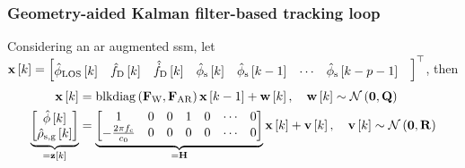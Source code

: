 \documentclass[
    hyperref={colorlinks,citecolor=DeepPink4,linkcolor=DarkRed,urlcolor=DarkBlue}
]{beamer_class}
\begin{document}
\begin{frame}[t]
	\frametitle{Geometry-aided Kalman filter-based tracking loop}
    Considering an \gls{ar} augmented \gls{ssm}, let \(\mathbf{x} \left[ k \right]= \begin{bmatrix}
        \hat{\phi}_{\mathrm{LOS}} \left[ k \right] &
        \hat{f}_{\mathrm{D}} \left[ k \right] &
        \hat{\dot{f}}_{\mathrm{D}} \left[ k \right] &
        \hat{\phi}_{\textnormal{s}} \left[ k \right] &
        \hat{\phi}_{\textnormal{s}} \left[ k-1 \right] &
        \cdots &
        \hat{\phi}_{\textnormal{s}} \left[ k-p-1 \right] &
    \end{bmatrix}^\top\), then
	\begin{align}
     \mathbf{x} \left[ k \right] & = \mathrm{blkdiag} \left( \mathbf{F}_{\mathrm{W}}, \mathbf{F}_{\mathrm{AR}} \right) \mathbf{x} \left[ k-1 \right] + \mathbf{w} \left[ k \right], \quad \mathbf{w} \left[ k \right] \sim \mathcal{N} \left( \mathbf{0}, \mathbf{Q} \right) \\
    \underbrace{\begin{bmatrix}
        \hat{\phi} \left[ k \right] \\
        \hat{\rho}_{\textnormal{s}, \textnormal{g}} \left[ k \right]
    \end{bmatrix}}_{= \mathbf{z} \left[ k \right]} & = \underbrace{\begin{bmatrix}
        1 & 0 & 0 & 1 & 0 & \cdots & 0 \\
        - \frac{2 \pi f_{\mathrm{c}}}{c_{0}} & 0 & 0 & 0 & 0 & \cdots & 0
    \end{bmatrix}}_{= \mathbf{H}} \mathbf{x} \left[ k \right] + \mathbf{v} \left[ k \right], \quad \mathbf{v} \left[ k \right] \sim \mathcal{N} \left( \mathbf{0}, \mathbf{R} \right)
    \end{align}
\end{frame}
\end{document}
